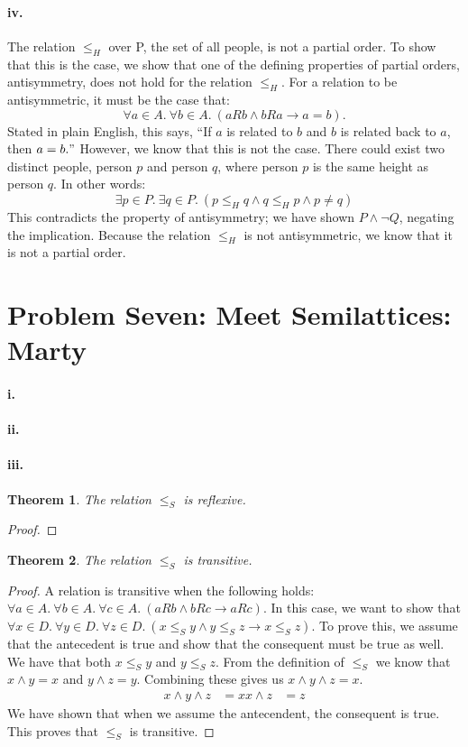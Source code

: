 \documentclass[10pt,letter]{article}
\newtheorem*{thm}{Theorem}
\begin{document}
\paragraph{iv.} The relation $\leq_H$ over P, the set of all people, is not a partial order. To show that this is the case, we show that one of the defining properties of partial orders, antisymmetry, does not hold for the relation $\leq_H$. For a relation to be antisymmetric, it must be the case that:
$$\forall a \in A.\ \forall b \in A.\ (aRb \wedge bRa \rightarrow a=b).$$
Stated in plain English, this says, ``If $a$ is related to $b$ and $b$ is related back to $a$, then $a = b."$ However, we know that this is not the case. There could exist two distinct people, person $p$ and person $q$, where person $p$ is the same height as person $q$. In other words:
$$\exists p \in P.\ \exists q \in P.\ (p \leq_H q \wedge q \leq_H p \wedge p \neq q)$$
This contradicts the property of antisymmetry; we have shown $P \wedge \neg Q$, negating the implication. Because the relation $\leq_H$ is not antisymmetric, we know that it is not a partial order.

\section*{Problem Seven: Meet Semilattices: Marty}

\paragraph{i.} 
\paragraph{ii.}
\paragraph{iii.} 
\begin{thm} The relation $\le_S$ is reflexive. \end{thm}
\begin{proof} 
\end{proof}

\begin{thm} The relation $\le_S$ is transitive. \end{thm}
\begin{proof} A relation is transitive when the following holds: $\forall a \in A .\ \forall b \in A .\ \forall c \in A .\ (aRb \wedge bRc \rightarrow aRc)$. In this case, we want to show that $\forall x \in D .\ \forall y \in D .\ \forall z \in D .\ (x \le_S y \wedge y \le_S z \rightarrow x \le_S z)$. To prove this, we assume that the antecedent is true and show that the consequent must be true as well. We have that both $x \le_S y$ and $y \le_S z$. From the definition of $\le_S$ we know that $x \wedge y = x$ and $y \wedge z = y$. Combining these gives us $x \wedge y \wedge z = x$. 
\begin{align*}
x \wedge y \wedge z &= x
x \wedge z &= z
\end{align*}
We have shown that when we assume the antecendent, the consequent is true. This proves that $\le_S$ is transitive.
\end{proof}
\end{document}

